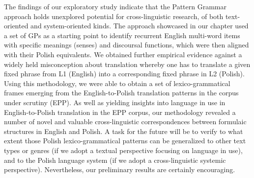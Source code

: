 \documentclass[output=paper]{langscibook}
\begin{document}
The findings of our exploratory study indicate that the Pattern Grammar approach holds unexplored potential for cross-linguistic research, of both text-ori\-ent\-ed and system-oriented kinds. The approach showcased in our chapter used a set of GPs as a starting point to identify recurrent English multi-word items with specific meanings (senses) and discoursal functions, which were then aligned with their Polish equivalents. We obtained further empirical evidence against a widely held misconception about translation whereby one has to translate a given fixed phrase from L1 (English) into a corresponding fixed phrase in L2 (Polish). Using this methodology, we were able to obtain a set of lexico-grammatical frames emerging from the English-to-Polish translation patterns in the corpus under scrutiny (EPP). As well as yielding insights into language in use in English-to-Polish translation in the EPP corpus, our methodology revealed a number of novel and valuable cross-linguistic correspondences between formulaic structures in English and Polish. A task for the future will be to verify to what extent those Polish lexico-grammatical patterns can be generalized to other text types or genres (if we adopt a textual perspective focusing on language in use), and to the Polish language system (if we adopt a cross-linguistic systemic perspective). Nevertheless, our preliminary results are certainly encouraging. 
\end{document}
